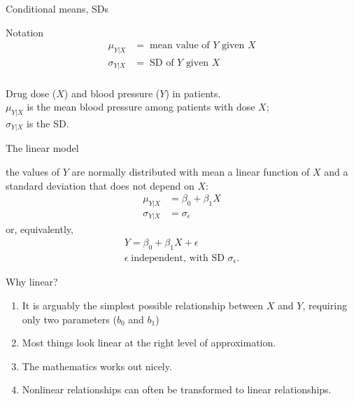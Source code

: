 


\begin{frame}{Conditional means, SDs}

  \begin{block}{Notation}
    \begin{align*}
      \mu_{Y|X} &= \; \text{mean value of $Y$ given $X$} \\
      \sigma_{Y|X} &= \; \text{SD of $Y$ given $X$} \\
    \end{align*}
  \end{block}


    \vspace{2em}

    Drug dose ($X$) and blood pressure ($Y$) in patients. \\
    $\mu_{Y|X}$ is the mean blood pressure among patients with dose $X$; \\
    $\sigma_{Y|X}$ is the SD.

\end{frame}

\begin{frame}{The linear model}

   the values of $Y$ are normally distributed with mean
  a linear function of $X$ and a standard deviation that does not depend on $X$:
  \begin{align*}
    \mu_{Y|X} &= \beta_0 + \beta_1 X \\
    \sigma_{Y|X} &= \sigma_\epsilon
  \end{align*}
  or, equivalently,
  \begin{align*}
    Y = \beta_0 + \beta_1 X + \epsilon \\
    \epsilon \; \text{independent, with SD $\sigma_\epsilon$} .
  \end{align*}

\end{frame}


\begin{frame}{Why linear?}

  \begin{enumerate}
      
    \item It is arguably the simplest possible relationship between $X$ and $Y$,
      requiring only two parameters ($b_0$ and $b_1$)

    \item Most things look linear at the right level of approximation.

    \item The mathematics works out nicely.

    \item Nonlinear relationships can often be transformed to linear relationships.

  \end{enumerate}

\end{frame}


